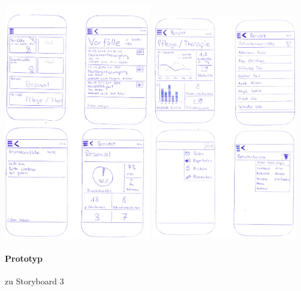\documentclass[a4paper]{scrreprt}
\begin{document}
\includegraphics[width=0.48\textwidth]{storyboards_personas_prototypes/iteration3/sprim5+eller1_prototyp2_1.png}
\includegraphics[width=0.48\textwidth]{storyboards_personas_prototypes/iteration3/sprim5+eller1_prototyp2_2.png}

\pagebreak
\paragraph{Prototyp } zu Storyboard 3\\
\end{document}
